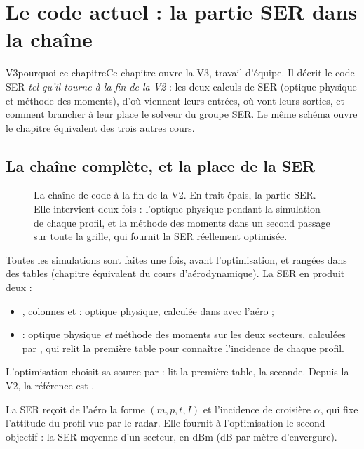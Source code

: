 \chapter{Le code actuel : la partie SER dans la chaîne}\label{ch:code-actuel}


\begin{evolution}{V3}{pourquoi ce chapitre}Ce chapitre ouvre la V3, travail d'équipe. Il décrit le code SER \emph{tel qu'il tourne à la fin de la V2} : les deux calculs de SER (optique physique et méthode des moments), d'où viennent leurs entrées, où vont leurs sorties, et comment brancher à leur place le solveur du groupe SER. Le même schéma ouvre le chapitre équivalent des trois autres cours.\end{evolution}

\section{La chaîne complète, et la place de la SER}
\begin{figure}[htbp]
\centering
{}
\caption{La chaîne de code à la fin de la V2. En trait épais, la partie SER. Elle intervient deux fois : l'optique physique pendant la simulation de chaque profil, et la méthode des moments dans un second passage sur toute la grille, qui fournit la SER réellement optimisée.}\label{fig:chaine-ser}
\end{figure}

Toutes les simulations sont faites une fois, avant l'optimisation, et rangées dans des tables (chapitre équivalent du cours d'aérodynamique). La SER en produit deux :
\begin{itemize}
\item {}, colonnes  et  : optique physique, calculée dans  avec l'aéro ;
\item {} : optique physique \emph{et} méthode des moments sur les deux secteurs, calculées par , qui relit la première table pour connaître l'incidence de chaque profil.
\end{itemize}
L'optimisation choisit sa source par  :  lit la première table,  la seconde. Depuis la V2, la référence est .

\begin{projet}
La SER reçoit de l'aéro la forme $(m,p,t,I)$ et l'incidence de croisière $\alpha$, qui fixe l'attitude du profil vue par le radar. Elle fournit à l'optimisation le second objectif : la SER moyenne d'un secteur, en dBm (dB par mètre d'envergure).
\end{projet}

